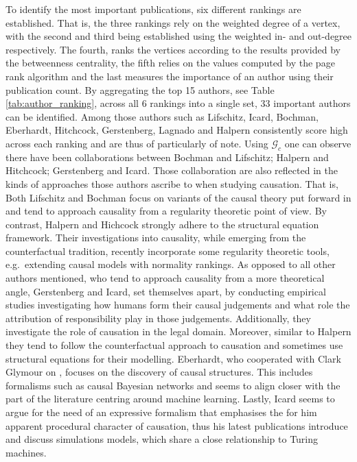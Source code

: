 \documentclass[11pt,a4paper]{book}
\theoremstyle{definition}
\theoremstyle{definition}
\theoremstyle{definition}
\theoremstyle{remark}
\newcommand{\cgraph}{\mathcal{G}_{c}}
\begin{document}
To identify the most important publications, six different rankings are established. That is, the three rankings rely on the weighted degree of a vertex, with the second and third being established using the weighted in- and out-degree respectively.
The fourth, ranks the vertices according to the results provided by the betweenness centrality, the fifth relies on the values computed by the page rank algorithm and the last measures the importance of an author using their publication count.
By aggregating the top 15 authors, see Table \ref{tab:author_ranking}, across all 6 rankings into a single set, $33$ important authors can be identified. 
Among those authors such as Lifschitz, Icard, Bochman, Eberhardt, Hitchcock, Gerstenberg, Lagnado and Halpern consistently score high across each ranking and are thus of particularly of note.
Using $\cgraph$ one can observe there have been collaborations between Bochman and Lifschitz; Halpern and Hitchcock; Gerstenberg and Icard. 
Those collaboration are also reflected in the kinds of approaches those authors ascribe to when studying causation. That is, 
Both Lifschitz and Bochman focus on variants of the causal theory put forward in \cite{mccain1997causal} and tend to approach causality from a regularity theoretic point of view. By contrast, Halpern and Hichcock strongly adhere to the structural equation framework. Their investigations into causality, while emerging from the counterfactual tradition, recently incorporate some regularity theoretic tools, e.g.\ extending causal models with normality rankings.
As opposed to all other authors mentioned, who tend to approach causality from a more theoretical angle, Gerstenberg and Icard, set themselves apart, by conducting empirical studies investigating how humans form their causal judgements and what role the attribution of responsibility play in those judgements. Additionally, they investigate the role of causation in the legal domain. Moreover, similar to Halpern they tend to follow the counterfactual approach to causation and sometimes use structural equations for their modelling.
Eberhardt, who cooperated with Clark Glymour on \parencite{glymour2010actual}, focuses on the discovery of causal structures. This includes formalisms such as causal Bayesian networks and seems to align closer with the part of the literature centring around machine learning. Lastly, Icard seems to argue for the need of an expressive formalism that emphasises the for him apparent procedural character of causation, thus his latest publications introduce and discuss simulations models, which share a close relationship to Turing machines.
\end{document}
